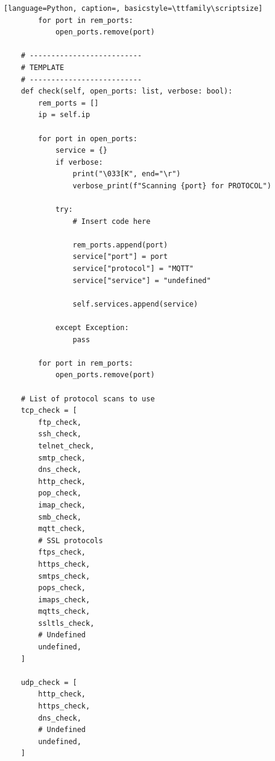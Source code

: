 \documentclass[12pt]{report}
\begin{document}
\begin{lstlisting}[language=Python, caption=, basicstyle=\ttfamily\scriptsize]
        for port in rem_ports:
            open_ports.remove(port)

    # --------------------------
    # TEMPLATE
    # --------------------------
    def check(self, open_ports: list, verbose: bool):
        rem_ports = []
        ip = self.ip

        for port in open_ports:
            service = {}
            if verbose:
                print("\033[K", end="\r")
                verbose_print(f"Scanning {port} for PROTOCOL")

            try:
                # Insert code here

                rem_ports.append(port)
                service["port"] = port
                service["protocol"] = "MQTT"
                service["service"] = "undefined"

                self.services.append(service)

            except Exception:
                pass

        for port in rem_ports:
            open_ports.remove(port)

    # List of protocol scans to use
    tcp_check = [
        ftp_check,
        ssh_check,
        telnet_check,
        smtp_check,
        dns_check,
        http_check,
        pop_check,
        imap_check,
        smb_check,
        mqtt_check,
        # SSL protocols
        ftps_check,
        https_check,
        smtps_check,
        pops_check,
        imaps_check,
        mqtts_check,
        ssltls_check,
        # Undefined
        undefined,
    ]

    udp_check = [
        http_check,
        https_check,
        dns_check,
        # Undefined
        undefined,
    ]
\end{lstlisting}
\end{document}
